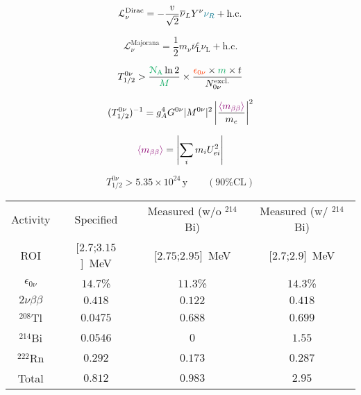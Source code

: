 \documentclass[a4paper,17pt, twoside]{memoir}   	%
\newcommand{\twonu}{2\nu\beta\beta}
\newcommand{\Tl}{$^{208}$Tl}
\newcommand{\Bi}{$^{214}$Bi}
\newcommand{\Rn}{$^{222}$Rn}
\newcommand{\Tbeta}{T_{1/2}^{0\nu}}
\newcommand{\mbb}{m_{\beta\beta}}
\begin{document}
\begin{equation}
\mathcal{L}^{\text{Dirac}}_{\nu}=-\frac{v}{\sqrt{2}}\overline{\nu}_{L}Y^{\nu}{\color{blue!55!green}{\nu_{R}}} + \text{h.c.}
\end{equation}

\begin{equation}
    \mathcal{L}^{\text{Majorana}}_{\nu}=\dfrac{1}{2}m_{\nu}\overline{\nu}^{c}_{\text{L}}\nu_{\text{L}}+\text{h.c.}
\end{equation}

\begin{equation}
  \Tbeta > \frac{\textcolor{blue!35!green}{\mathcal{N}_{\text{A}}}\ln{2}}{\textcolor{blue!35!green}{M}}\times \frac{\textcolor{orange!45!red}{\epsilon_{0\nu}}\times \textcolor{blue!35!green}{m}\times t}{N_{0\nu}^{\text{excl.}}}
\end{equation}

\begin{equation}
  (T_{1/2}^{0\nu})^{-1} = g_{A}^{4}G^{0\nu}|M^{0\nu}|^{2}\left\lvert\dfrac{\textcolor{blue!45!red}{\langle m_{\beta\beta}\rangle}}{m_{e}}\right\rvert^{2}
\end{equation}

\begin{equation}
  \textcolor{blue!45!red}{\langle \mbb \rangle} = \left\vert \sum_{i}m_{i}U^{2}_{ei} \right\vert
\end{equation}

\begin{equation}
\Tbeta > 5.35\times 10^{24}\,\text{y}\qquad (90\% \text{CL})
\end{equation}


\begin{table}[h!]
  \centering
  \begin{tabular}{|c|c|c|c|}
    \hline
    Activity & Specified & Measured (w/o \Bi) & Measured (w/ \Bi) \\
    ROI & [$2.7$;$3.15$]~MeV & [$2.75$;$2.95$]~MeV & [$2.7$;$2.9$]~MeV \\
    \hline\hline
    $\epsilon_{0\nu}$ & $14.7$\% & $11.3$\% & $14.3$\% \\
    \hdashline
    $\twonu$  & $0.418$ & $0.122$ & $0.418$ \\
    \Tl  & $0.0475$ & $0.688$ & $0.699$ \\
    \Bi  & $0.0546$ & $0$ & $1.55$ \\
    \Rn  & $0.292$ & $0.173$ & $0.287$ \\
    Total & $0.812$ & $0.983$ & $2.95$ \\
    \hline
  \end{tabular}
\end{table}
\end{document}
